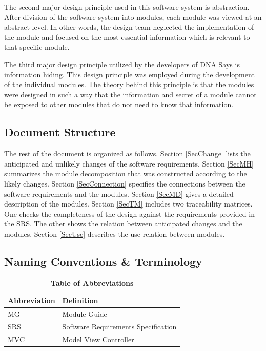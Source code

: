 \documentclass[12pt, titlepage]{article}
\begin{document}
\par The second major design principle used in this software system is abstraction. After division of the software system into modules, each module was viewed at an abstract level. In other words, the design team neglected the implementation of the module and focused on the most essential information which is relevant to that specific module.  \\

\par The third major design principle utilized by the developers of DNA Says is information hiding. This design principle was employed during the development of the individual modules. The theory behind this principle is that the modules were designed in such a way that the information and secret of a module cannot be exposed to other modules that do not need to know that information.



\subsection{Document Structure}


The rest of the document is organized as follows. Section
\ref{SecChange} lists the anticipated and unlikely changes of the software
requirements. Section \ref{SecMH} summarizes the module decomposition that
was constructed according to the likely changes. Section \ref{SecConnection}
specifies the connections between the software requirements and the
modules. Section \ref{SecMD} gives a detailed description of the
modules. Section \ref{SecTM} includes two traceability matrices. One checks
the completeness of the design against the requirements provided in the SRS. The
other shows the relation between anticipated changes and the modules. Section
\ref{SecUse} describes the use relation between modules.

\subsection{Naming Conventions \& Terminology}

\begin{table}[hbp]
\caption{\textbf{Table of Abbreviations}} \label{Table}
\begin{tabularx}{\textwidth}{p{3cm}X}
\toprule
\textbf{Abbreviation} & \textbf{Definition} \\
\midrule
MG & Module Guide\\
SRS & Software Requirements Specification\\
MVC & Model View Controller\\
\bottomrule
\end{tabularx}
\end{table}
\end{document}
